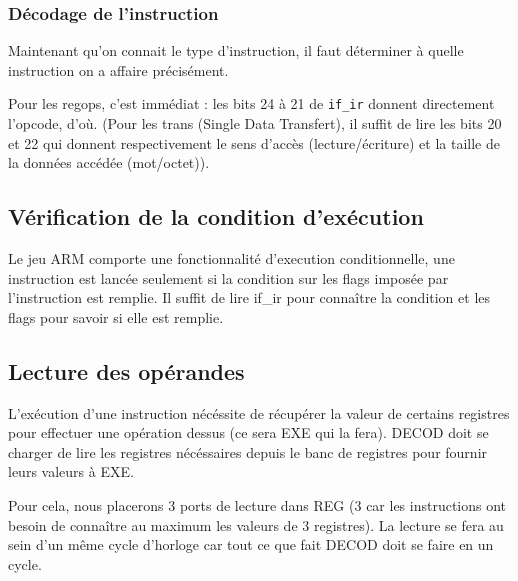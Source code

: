 \documentclass{article}
\begin{document}


\subsubsection{Décodage de l'instruction}

Maintenant qu'on connait le type d'instruction, il faut déterminer à quelle instruction
on a affaire précisément.

Pour les regops, c'est immédiat : les bits 24 à 21 de \texttt{if\_ir} donnent directement l'opcode,
d'où. (Pour les trans (Single Data Transfert), il suffit de lire les bits 20 et 22 qui donnent
respectivement le sens d'accès (lecture/écriture) et la taille de la données accédée (mot/octet)).



\subsection{Vérification de la condition d'exécution}

Le jeu ARM comporte une fonctionnalité d'execution conditionnelle,
une instruction est lancée seulement si la condition sur les flags imposée
par l'instruction est remplie. Il suffit de lire if\_ir pour connaître la condition
et les flags pour savoir si elle est remplie.



\subsection{Lecture des opérandes}

L'exécution d'une instruction nécéssite de récupérer la valeur de certains registres pour
effectuer une opération dessus (ce sera EXE qui la fera). DECOD doit se charger
de lire les registres nécéssaires depuis le banc de registres pour fournir leurs valeurs à EXE.

Pour cela, nous placerons 3 ports de lecture dans REG (3 car les instructions ont besoin de
connaître au maximum les valeurs de 3 registres). La lecture se fera au sein d'un même cycle d'horloge
car tout ce que fait DECOD doit se faire en un cycle.
\end{document}
